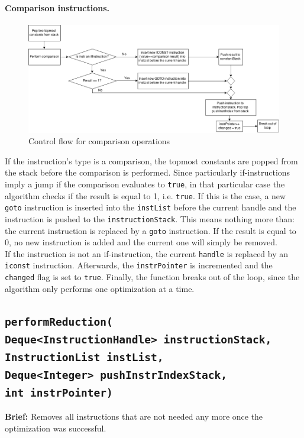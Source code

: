 \paragraph{Comparison instructions.}
\begin{figure}[h!]
\centering
\includegraphics[scale=0.45]{figures/comparison}
\caption{Control flow for comparison operations}
\end{figure}

If the instruction’s type is a comparison, the topmost constants are popped from the stack before the comparison is performed. Since particularly if-instructions imply a jump if the comparison evaluates to \texttt{true}, in that particular case the algorithm checks if the result is equal to 1, i.e. \texttt{true}. If this is the case, a new \texttt{goto} instruction is inserted into the \texttt{instList} before the current handle and the instruction is pushed to the \texttt{instructionStack}. This means nothing more than: the current instruction is replaced by a \texttt{goto} instruction. If the result is equal to 0, no new instruction is added and the current one will simply be removed.\\
If the instruction is not an if-instruction, the current \texttt{handle} is replaced by an \texttt{iconst} instruction. Afterwards, the \texttt{instrPointer} is incremented and the \texttt{changed} flag is set to \texttt{true}. Finally, the function breaks out of the loop, since the algorithm only performs one optimization at a time.

\subsection{\texttt{performReduction(\\
\hspace{2cm}Deque<InstructionHandle> instructionStack, \\
\hspace{2cm}InstructionList instList, \\
\hspace{2cm}Deque<Integer> pushInstrIndexStack, \\
\hspace{2cm}int instrPointer)}}
\label{subsec:performreduction}
\textbf{Brief: }Removes all instructions that are not needed any more once the optimization was successful. \\

